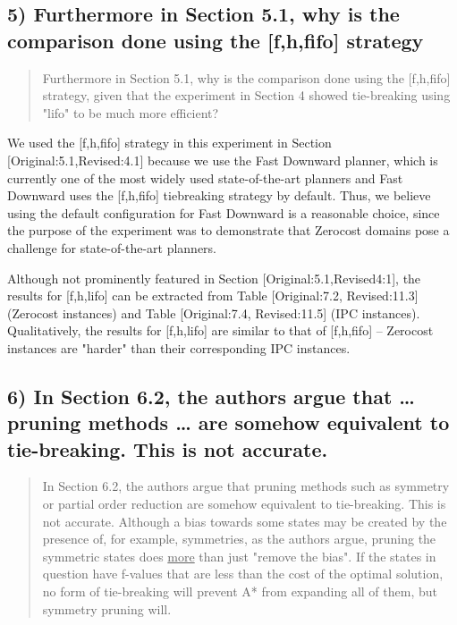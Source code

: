 \documentclass{article}
\begin{document}
\subsection{5) Furthermore in Section 5.1, why is the comparison done using the [f,h,fifo] strategy}
\label{sec:orgheadline30}

\begin{quote}
 Furthermore in Section 5.1, why is the comparison done using the
[f,h,fifo] strategy, given that the experiment in Section 4 showed
tie-breaking using "lifo" to be much more efficient?
\end{quote}

We used the [f,h,fifo] strategy in this experiment in Section [Original:5.1,Revised:4.1] because
we use the Fast Downward planner, which is currently one of the most widely used state-of-the-art planners
and Fast Downward uses the [f,h,fifo] tiebreaking strategy by default.
Thus, we believe using the default configuration for Fast Downward is a reasonable choice, since the purpose of the experiment was to demonstrate that Zerocost domains pose a challenge for state-of-the-art planners.

Although not prominently featured in Section [Original:5.1,Revised4:1], 
the results for [f,h,lifo] can be extracted from 
Table [Original:7.2, Revised:11.3] (Zerocost instances) and Table [Original:7.4, Revised:11.5] (IPC instances).
Qualitatively, the results for [f,h,lifo] are similar to that of [f,h,fifo] -- Zerocost instances are "harder" than their corresponding IPC instances.

\subsection{6) In Section 6.2, the authors argue that \ldots{} pruning methods \ldots{} are somehow equivalent to tie-breaking. This is not accurate.}
\label{sec:orgheadline31}

\begin{quote}
 In Section 6.2, the authors argue that pruning methods such as
symmetry or partial order reduction are somehow equivalent to
tie-breaking. This is not accurate. Although a bias towards some
states may be created by the presence of, for example, symmetries, as
the authors argue, pruning the symmetric states does \underline{more} than just
"remove the bias". If the states in question have f-values that are
less than the cost of the optimal solution, no form of tie-breaking
will prevent A* from expanding all of them, but symmetry pruning will.
\end{quote}
\end{document}
